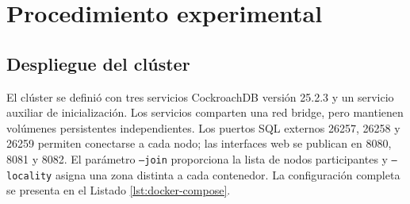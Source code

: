 \documentclass[12pt,a4paper]{article}
\begin{document}
\section{Procedimiento experimental}
\label{sec:procedimiento}

\subsection{Despliegue del clúster}

El clúster se definió con tres servicios CockroachDB versión 25.2.3 y un servicio auxiliar de inicialización. Los servicios comparten una red bridge, pero mantienen volúmenes persistentes independientes. Los puertos SQL externos 26257, 26258 y 26259 permiten conectarse a cada nodo; las interfaces web se publican en 8080, 8081 y 8082. El parámetro \texttt{--join} proporciona la lista de nodos participantes y \texttt{--locality} asigna una zona distinta a cada contenedor. La configuración completa se presenta en el Listado \ref{lst:docker-compose}.
\end{document}
